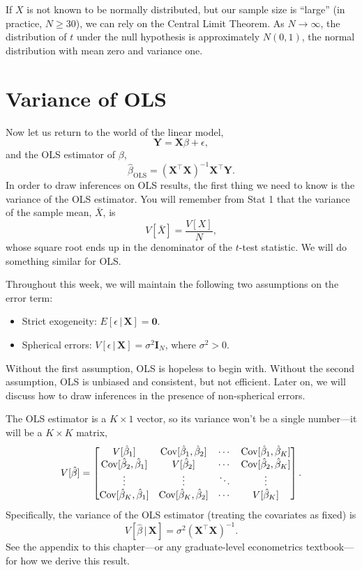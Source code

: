 \documentclass[
  12pt,
  oneside,openany]{book}
\begin{document}
If \(X\) is not known to be normally distributed, but our sample size is ``large'' (in practice, \(N \geq 30\)), we can rely on the Central Limit Theorem. As \(N \to \infty\), the distribution of \(t\) under the null hypothesis is approximately \(N(0, 1)\), the normal distribution with mean zero and variance one.

\hypertarget{variance-of-ols}{%
\section{Variance of OLS}\label{variance-of-ols}}

Now let us return to the world of the linear model,
\[
\mathbf{Y} = \mathbf{X} \beta + \epsilon,
\]
and the OLS estimator of \(\beta\),
\[
\hat{\beta}_{\text{OLS}} = (\mathbf{X}^\top \mathbf{X})^{-1} \mathbf{X}^\top \mathbf{Y}.
\]
In order to draw inferences on OLS results, the first thing we need to know is the variance of the OLS estimator. You will remember from Stat 1 that the variance of the sample mean, \(\bar{X}\), is
\[
V[\bar{X}] = \frac{V[X]}{N},
\]
whose square root ends up in the denominator of the \(t\)-test statistic. We will do something similar for OLS.

Throughout this week, we will maintain the following two assumptions on the error term:

\begin{itemize}
\item
  Strict exogeneity: \(E[\epsilon \,|\, \mathbf{X}] = \mathbf{0}\).
\item
  Spherical errors: \(V[\epsilon \,|\, \mathbf{X}] = \sigma^2 \mathbf{I}_N\), where \(\sigma^2 > 0\).
\end{itemize}

Without the first assumption, OLS is hopeless to begin with. Without the second assumption, OLS is unbiased and consistent, but not efficient. Later on, we will discuss how to draw inferences in the presence of non-spherical errors.

The OLS estimator is a \(K \times 1\) vector, so its variance won't be a single number---it will be a \(K \times K\) matrix,
\[
V[\hat{\beta}] = \begin{bmatrix}
  V[\hat{\beta}_1] & \mathop{\rm Cov}\nolimits[\hat{\beta}_1, \hat{\beta}_2] & \cdots & \mathop{\rm Cov}\nolimits[\hat{\beta}_1, \hat{\beta}_K] \\
  \mathop{\rm Cov}\nolimits[\hat{\beta}_2, \hat{\beta}_1] & V[\hat{\beta}_2] & \cdots & \mathop{\rm Cov}\nolimits[\hat{\beta}_2, \hat{\beta}_K] \\
  \vdots & \vdots & \ddots & \vdots \\
  \mathop{\rm Cov}\nolimits[\hat{\beta}_K, \hat{\beta}_1] & \mathop{\rm Cov}\nolimits[\hat{\beta}_K, \hat{\beta}_2] & \cdots & V[\hat{\beta}_K] \\
\end{bmatrix}.
\]
Specifically, the variance of the OLS estimator (treating the covariates as fixed) is
\[
V[\hat{\beta} \,|\, \mathbf{X}] = \sigma^2 (\mathbf{X}^\top \mathbf{X})^{-1}.
\]
See the appendix to this chapter---or any graduate-level econometrics textbook---for how we derive this result.
\end{document}
